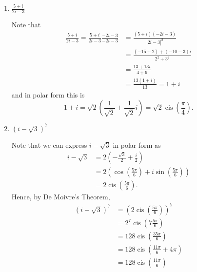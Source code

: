 \documentclass[11pt]{article}
\begin{document}
\begin{enumerate}
\begin{enumerate}
   \item $\displaystyle\frac{5+i}{2i-3}$
   \begin{Solution}
Note that 
\begin{align*}
 \frac{5+i}{2i-3} = \frac{5+i}{2i-3}\frac{-2i-3}{-2i-3} &= \frac{(5+i)(-2i-3)}{|2i-3|^2} \\&= \frac{(-15+2)+(-10-3)i}{2^2 + 3^2} \\&= \frac{13+13i}{4+9} \\&= \frac{13(1+i)}{13} = 1+i
\end{align*}
and in polar form this is
\[
 1+i = \sqrt{2}\left(\frac{1}{\sqrt{2}}+\frac{1}{\sqrt{2}}i\right) =  \sqrt{2}\operatorname{cis}\left(\frac{\pi}{4}\right).
\]
\begin{center}
\end{center}
\end{Solution}
\item $(i-\sqrt{3})^7$
\begin{Solution}
 Note that we can express $i-\sqrt{3}$ in polar form as
 \begin{align*}
  i-\sqrt{3}& = 2\left(-\frac{\sqrt{3}}{2}+\frac{i}{2}\right)\\
   & =2\left(\cos\left(\frac{5\pi}{6}\right) + i\sin\left(\frac{5\pi}{6}\right) \right)\\
    & = 2\operatorname{cis}\left(\frac{5\pi}{6}\right).
 \end{align*}
 Hence, by De Moivre's Theorem,
 \begin{align*}
  (i-\sqrt{3})^7 & = \left(2\operatorname{cis}\left(\frac{5\pi}{6}\right)\right)^7\\
  & =2^7\operatorname{cis}\left(7\frac{5\pi}{6}\right)\\
   & = 128 \operatorname{cis}\left(\frac{35\pi}{6}\right)\\
   & = 128\operatorname{cis}\left(\frac{11\pi}{6}+4\pi\right)\\
   & = 128\operatorname{cis}\left(\frac{11\pi}{6}\right)\\

\end{align*}
\end{Solution}
\end{enumerate}
\end{enumerate}
\end{document}
